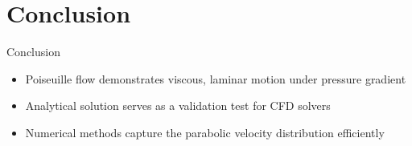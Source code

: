 \documentclass{beamer}
\begin{document}
\section{Conclusion}
\begin{frame}{Conclusion}
\begin{itemize}
    \item Poiseuille flow demonstrates viscous, laminar motion under pressure gradient
    \item Analytical solution serves as a validation test for CFD solvers
    \item Numerical methods capture the parabolic velocity distribution efficiently
\end{itemize}
\end{frame}
\end{document}

